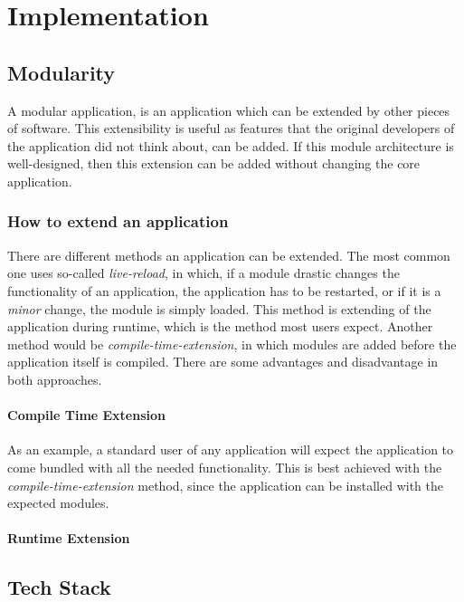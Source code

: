\chapter{Implementation}

\section{Modularity}

A modular application, is an application which can be extended by other pieces
of software. This extensibility is useful as features that the original
developers of the application did not think about, can be added. If this module
architecture is well-designed, then this extension can be added without changing
the core application.

\subsection{How to extend an application}

There are different methods an application can be extended. The most common one
uses so-called \textit{live-reload}, in which, if a module drastic changes the
functionality of an application, the application has to be restarted, or if it
is a \textit{minor} change, the module is simply loaded. This method is
extending of the application during runtime, which is the method most users
expect. Another method would be \textit{compile-time-extension}, in which
modules are added before the application itself is compiled. There are some
advantages and disadvantage in both approaches.

\subsubsection{Compile Time Extension}

As an example, a standard user of any application will expect the application to
come bundled with all the needed functionality. This is best achieved with the
\textit{compile-time-extension} method, since the application can be installed
with the expected modules.

\subsubsection{Runtime Extension}


\section{Tech Stack}

